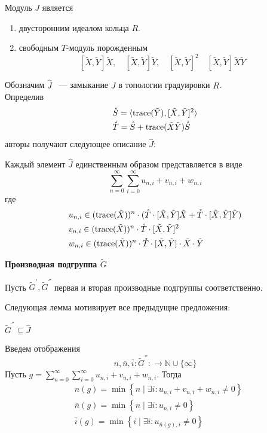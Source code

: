 \begin{proposition}
    Модуль $J$ является
    \begin{enumerate}
        \item двусторонним идеалом кольца $R$.
        \item свободным $T$-модуль порожденным \[[\tilde{X}, \tilde{Y}] \tilde{X}, \quad [\tilde{X}, \tilde{Y}] \tilde{Y}, \quad [\tilde{X}, \tilde{Y}]^2 \quad [\tilde{X}, \tilde{Y}]\tilde{X}\tilde{Y}\]
    \end{enumerate}
\end{proposition}
Обозначим $\hat{J}$ ~--- замыкание $J$ в топологии градуировки $R$.\\
Определив
\begin{align*}
    & \mathring{S} = \langle \mathrm{trace}(\tilde{Y}), [\tilde{X}, \tilde{Y}]^2 \rangle \\
    & \mathring{T} = \mathring{S} + \mathrm{trace}(\tilde{X}\tilde{Y}) \mathring{S}
\end{align*}
авторы получают следующее описание $\hat{J}$:
\begin{proposition}
    Каждый элемент $\hat{J}$ единственным образом представляется в виде
    \[
        \sum\limits_{n=0}^{\infty}\sum\limits_{i=0}^{\infty}
        u_{n,i} + v_{n,i} + w_{n,i}
    \]
    где
    \begin{align*}
        & u_{n,i} \in (\mathrm{trace}(\tilde{X}))^n \cdot (\mathring{T}\cdot[\tilde{X}, \tilde{Y}]\tilde{X} + \mathring{T}\cdot[\tilde{X}, \tilde{Y}]\tilde{Y}) \\
        & v_{n,i} \in (\mathrm{trace}(\tilde{X}))^n \cdot \mathring{T} \cdot [\tilde{X}, \tilde{Y}]^2 \\
        & w_{n,i} \in (\mathrm{trace}(\tilde{X}))^n \cdot \mathring{T} \cdot [\tilde{X}, \tilde{Y}]\cdot \tilde{X} \cdot \tilde{Y}
    \end{align*}
\end{proposition}

\vskip 0.1in\noindent
{\large\textbf{Производная подгруппа $\tilde{G}$}}

Пусть $\tilde{G}^{'}, \tilde{G}^{''}$ первая и вторая производные подгруппы соответственно.

Следующая лемма мотивирует все предыдущие предложения:
\begin{lemma}
    $\tilde{G}^{''}\subseteq \hat{J}$
\end{lemma}

Введем отображения
\[
    n, \overline{n}, \overline{i}: \tilde{G}^{''}: \to \mathbb{N}\cup\{{\infty}\}
\]
Пусть $g = \sum\limits_{n=0}^{\infty}\sum\limits_{i=0}^{\infty}u_{n,i} + v_{n,i} + w_{n,i}$.
Тогда
\begin{align*}
    & n(g) = \min \left\{ n \mid \exists i: u_{n,i} + v_{n,i} + w_{n,i} \neq 0 \right\} \\
    & \overline{n}(g) = \min \left\{  n \mid \exists i: u_{n,i} \neq 0 \right\} \\
    & \overline{i}(g) = \min \left\{  i \mid \exists i: u_{\overline{n}(g),i} \neq 0 \right\}
\end{align*}


